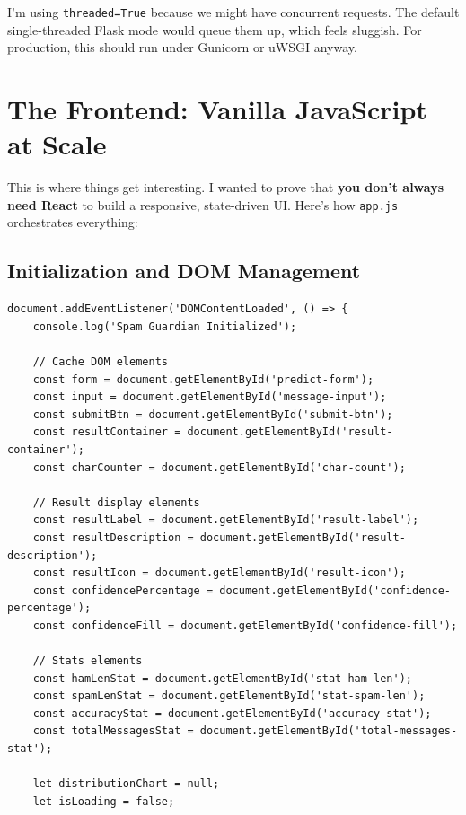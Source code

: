 \documentclass[12pt, a4paper]{article}
\begin{document}
\begin{devnote}
I'm using \texttt{threaded=True} because we might have concurrent requests. The default single-threaded Flask mode would queue them up, which feels sluggish. For production, this should run under Gunicorn or uWSGI anyway.
\end{devnote}

\section{The Frontend: Vanilla JavaScript at Scale}

This is where things get interesting. I wanted to prove that \textbf{you don't always need React} to build a responsive, state-driven UI. Here's how \texttt{app.js} orchestrates everything:

\subsection{Initialization and DOM Management}

\begin{verbatim}
document.addEventListener('DOMContentLoaded', () => {
    console.log('Spam Guardian Initialized');
    
    // Cache DOM elements
    const form = document.getElementById('predict-form');
    const input = document.getElementById('message-input');
    const submitBtn = document.getElementById('submit-btn');
    const resultContainer = document.getElementById('result-container');
    const charCounter = document.getElementById('char-count');
    
    // Result display elements
    const resultLabel = document.getElementById('result-label');
    const resultDescription = document.getElementById('result-description');
    const resultIcon = document.getElementById('result-icon');
    const confidencePercentage = document.getElementById('confidence-percentage');
    const confidenceFill = document.getElementById('confidence-fill');
    
    // Stats elements
    const hamLenStat = document.getElementById('stat-ham-len');
    const spamLenStat = document.getElementById('stat-spam-len');
    const accuracyStat = document.getElementById('accuracy-stat');
    const totalMessagesStat = document.getElementById('total-messages-stat');
    
    let distributionChart = null;
    let isLoading = false;
\end{verbatim}
\end{document}
